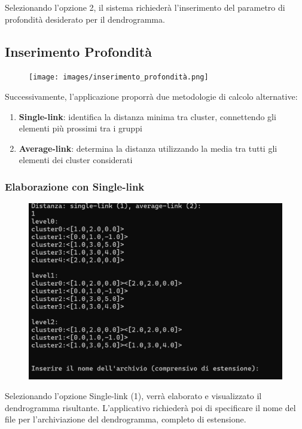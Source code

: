 Selezionando l'opzione 2, il sistema richiederà l'inserimento del parametro di profondità desiderato per il dendrogramma.

\subsection{Inserimento Profondità}

\begin{figure}[h!]
    \centering
    \texttt{[image: images/inserimento\_profondità.png]}
\end{figure}

Successivamente, l'applicazione proporrà due metodologie di calcolo alternative:
\begin{enumerate}
    \item \textbf{Single-link}: identifica la distanza minima tra cluster, connettendo gli elementi più prossimi tra i gruppi
    \item \textbf{Average-link}: determina la distanza utilizzando la media tra tutti gli elementi dei cluster considerati
\end{enumerate}

\subsubsection{Elaborazione con Single-link}

\begin{figure}[h!]
    \centering
    \includegraphics[width=\textwidth]{images/scelta_singleLink.png}
\end{figure}

Selezionando l'opzione Single-link (1), verrà elaborato e visualizzato il dendrogramma risultante. L'applicativo richiederà poi di specificare il nome del file per l'archiviazione del dendrogramma, completo di estensione.

